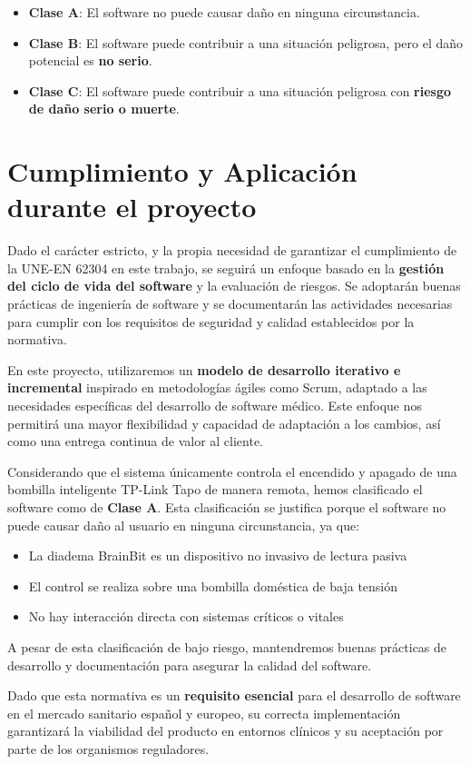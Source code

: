 \begin{itemize}
    \item \textbf{Clase A}: El software no puede causar daño en ninguna circunstancia.
    \item \textbf{Clase B}: El software puede contribuir a una situación peligrosa, pero el daño potencial es \textbf{no serio}.
    \item \textbf{Clase C}: El software puede contribuir a una situación peligrosa con \textbf{riesgo de daño serio o muerte}.
\end{itemize}

\section{Cumplimiento y Aplicación durante el proyecto}
Dado el carácter estricto, y la propia necesidad de garantizar el cumplimiento de la UNE-EN 62304 \cite{UNE-EN-62304} en este trabajo, se seguirá un enfoque basado en la \textbf{gestión del ciclo de vida del software} y la evaluación de riesgos. Se adoptarán buenas prácticas de ingeniería de software y se documentarán las actividades necesarias para cumplir con los requisitos de seguridad y calidad establecidos por la normativa.

En este proyecto, utilizaremos un \textbf{modelo de desarrollo iterativo e incremental} inspirado en metodologías ágiles como Scrum, adaptado a las necesidades específicas del desarrollo de software médico. Este enfoque nos permitirá una mayor flexibilidad y capacidad de adaptación a los cambios, así como una entrega continua de valor al cliente.

Considerando que el sistema únicamente controla el encendido y apagado de una bombilla inteligente TP-Link Tapo de manera remota, hemos clasificado el software como de \textbf{Clase A}. Esta clasificación se justifica porque el software no puede causar daño al usuario en ninguna circunstancia, ya que:
\begin{itemize}
    \item La diadema BrainBit es un dispositivo no invasivo de lectura pasiva
    \item El control se realiza sobre una bombilla doméstica de baja tensión
    \item No hay interacción directa con sistemas críticos o vitales
\end{itemize}

A pesar de esta clasificación de bajo riesgo, mantendremos buenas prácticas de desarrollo y documentación para asegurar la calidad del software.

Dado que esta normativa es un \textbf{requisito esencial} para el desarrollo de software en el mercado sanitario español y europeo, su correcta implementación garantizará la viabilidad del producto en entornos clínicos y su aceptación por parte de los organismos reguladores.
